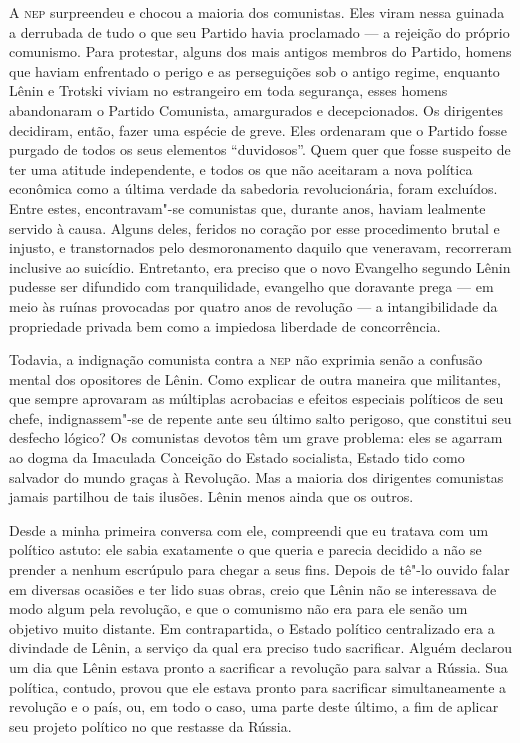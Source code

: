 \sectionitem
A \textsc{nep} surpreendeu e chocou a maioria dos comunistas. Eles viram nessa
guinada a derrubada de tudo o que seu Partido havia proclamado --- a
rejeição do próprio comunismo. Para protestar, alguns dos mais antigos
membros do Partido, homens que haviam enfrentado o perigo e as
perseguições sob o antigo regime, enquanto Lênin e Trotski viviam no
estrangeiro em toda segurança, esses homens abandonaram o Partido
Comunista, amargurados e decepcionados. Os dirigentes decidiram, então,
fazer uma espécie de greve. Eles ordenaram que o Partido fosse purgado
de todos os seus elementos “duvidosos”. Quem quer que fosse suspeito de
ter uma atitude independente, e todos os que não aceitaram a nova
política econômica como a última verdade da sabedoria revolucionária,
foram excluídos. Entre estes, encontravam"-se comunistas que, durante
anos, haviam lealmente servido à causa. Alguns deles, feridos no
coração por esse procedimento brutal e injusto, e transtornados pelo
desmoronamento daquilo que veneravam, recorreram inclusive ao suicídio.
Entretanto, era preciso que o novo Evangelho segundo Lênin pudesse ser
difundido com tranquilidade, evangelho que doravante prega --- em
meio às ruínas provocadas por quatro anos de revolução --- a
intangibilidade da propriedade privada bem como a impiedosa liberdade
de concorrência.

Todavia, a indignação comunista contra a \textsc{nep} não exprimia senão a
confusão mental dos opositores de Lênin. Como explicar de outra maneira
que militantes, que sempre aprovaram as múltiplas acrobacias e efeitos
especiais políticos de seu chefe, indignassem"-se de repente ante
seu último salto perigoso, que constitui seu desfecho lógico? Os
comunistas devotos têm um grave problema: eles se agarram ao dogma da
Imaculada Conceição do Estado socialista, Estado tido como salvador do
mundo graças à Revolução. Mas a maioria dos dirigentes comunistas
jamais partilhou de tais ilusões. Lênin menos ainda que os outros.

Desde a minha primeira conversa com ele, compreendi que eu tratava com
um político astuto: ele sabia exatamente o que queria e parecia
decidido a não se prender a nenhum escrúpulo para chegar a seus
fins. Depois de tê"-lo ouvido falar em diversas ocasiões e ter lido
suas obras, creio que Lênin não se interessava de modo algum pela
revolução, e que o comunismo não era para ele senão um objetivo muito
distante. Em contrapartida, o Estado político centralizado era a
divindade de Lênin, a serviço da qual era preciso tudo sacrificar.
Alguém declarou um dia que Lênin estava pronto a sacrificar a revolução
para salvar a Rússia. Sua política, contudo, provou que ele estava
pronto para sacrificar simultaneamente a revolução e o país, ou, em
todo o caso, uma parte deste último, a fim de aplicar seu projeto
político no que restasse da Rússia.

